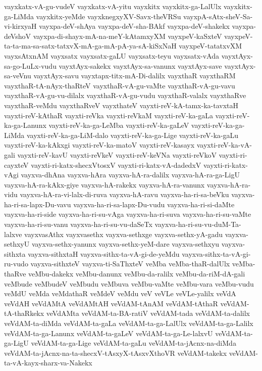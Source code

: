 {vayxkatx-vA-gu-vudeV
vayxkatx-vA-yitu
vayxkitx
vayxkitx-ga-LalUlx
vayxkitx-ga-LiMda
vayxkitx-yeMde
vayxknegxyXV-Savx-theVRSu
vayxpA-sAtx-sheV-Sa-vi-kirxyaH
vayxpa-deV-shAya
vayxpa-deV-sha-BAkf
vayxpa-deV-shakekx
vayxpa-deVshoV
vayxpa-di-shayx-mA-na-meY-kAtamxyXM
vayxpeV-kaSxteV
vayxpeV-ta-ta-ma-sa-satx-tatxvX-mA-ga-mA-pA-ya-sA-kiSxNaH
vayxpeV-tatatxvXM
vayxsAtxnAM
vayxsatx
vayxsatx-gaLU
vayxsatx-teyu
vayxsatx-vAda
vayxtAyx-sa-go-LuLx-vudu
vayxtAyx-sakekx
vayxtAyx-sa-vanunx
vayxtAyx-save
vayxtAyx-sa-veVnu
vayxtAyx-savu
vayxtapx-titx-mA-Di-dalilx
vayxthaR
vayxthaRM
vayxthaR-tA-nAyx-thaRteV
vayxthaR-vA-gu-vaMte
vayxthaR-vA-gu-vavu
vayxthaR-vA-gu-vu-dilalx
vayxthaR-vA-gu-vudu
vayxthaR-valalx
vayxthaRve
vayxthaR-veMdu
vayxthaRveV
vayxthateV
vayxti-reV-kA-tamx-ka-tavxtaH
vayxti-reV-kAthaR
vayxti-reVka
vayxti-reVkaM
vayxti-reV-ka-gaLa
vayxti-reV-ka-ga-Lanunx
vayxti-reV-ka-ga-LeMba
vayxti-reV-ka-gaLeV
vayxti-reV-ka-ga-LiMda
vayxti-reV-ka-ga-LiM-dalo
vayxti-reV-ka-ga-Lige
vayxti-reV-ka-gaLu
vayxti-reV-ka-kAkxgi
vayxti-reV-ka-matoV
vayxti-reV-kasayx
vayxti-reV-ka-vA-gali
vayxti-reV-kavU
vayxti-reVkeV
vayxti-reV-keVNa
vayxti-reVkoV
vayxti-ri-cayxteV
vayxti-ri-katx-shecxVtosxV
vayxti-ri-katx-vA-dadedxV
vayxti-ri-katx-vAgi
vayxva-dhAna
vayxva-hAra
vayxva-hA-ra-dalilx
vayxva-hA-ra-ga-LigU
vayxva-hA-ra-kAkx-giye
vayxva-hA-rakekx
vayxva-hA-ra-vanunx
vayxva-hA-ra-vidu
vayxva-hA-ra-vi-lalx-di-ruva
vayxva-hA-ravu
vayxva-ha-ri-sa-beVku
vayxva-ha-ri-sa-lapx-Du-vavu
vayxva-ha-ri-sa-lapx-Du-vudu
vayxva-ha-ri-si-daMte
vayxva-ha-ri-side
vayxva-ha-ri-su-vAga
vayxva-ha-ri-suva
vayxva-ha-ri-su-vaMte
vayxva-ha-ri-su-vanu
vayxva-ha-ri-su-vu-daSeTx
vayxva-ha-ri-su-vu-duM-Ta-lalxve
vayxvasAthx
vayxvasethx
vayxva-sethxge
vayxva-sethx-yA-gadu
vayxva-sethxyU
vayxva-sethx-yanunx
vayxva-sethx-yeM-dare
vayxva-sethxyu
vayxva-sithxta
vayxva-sithxtaH
vayxva-sithx-ta-vA-gi-de-yeMdu
vayxva-sithx-ta-vA-gi-ru-vudo
vayxva-sithxteV
vayxva-ti-SaThxteV
veMba
veMba-thaR-dalUlx
veMba-thaRve
veMbu-dakekx
veMbu-danunx
veMbu-da-ralilx
veMbu-da-riM-dA-gali
veMbude
veMbudeV
veMbudu
veMbuva
veMbu-vaMte
veMbu-vara
veMbu-vudu
veMdU
veMda
veMdathaR
veMdeV
veMdu
veV
veVLe
veVLe-yalilx
veVdA
veVdAH
veVdAMtA
veVdAMtAH
veVdAM-tAnAM
veVdAM-tAthaR
veVdAM-tA-thaRkekx
veVdAMta
veVdAM-ta-BA-ratiV
veVdAM-tada
veVdAM-ta-dalilx
veVdAM-ta-diMda
veVdAM-ta-gaLa
veVdAM-ta-ga-LalUlx
veVdAM-ta-ga-Lalilx
veVdAM-ta-ga-Lanunx
veVdAM-ta-gaLeV
veVdAM-ta-ga-Le-lalxvU
veVdAM-ta-ga-LigU
veVdAM-ta-ga-Lige
veVdAM-ta-gaLu
veVdAM-ta-jAcnx-na-diMda
veVdAM-ta-jAcnx-na-ta-shecxV-tAsxyX-tAsxvXthoVR
veVdAM-takekx
veVdAM-ta-vA-kayx-sharx-va-Nakekx
}
